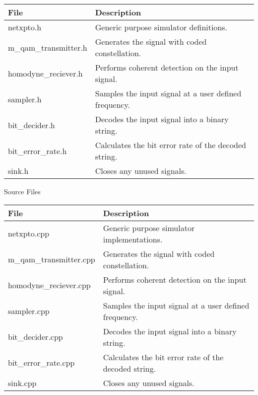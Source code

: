 \begin{table}[H]
\centering
\begin{tabulary}{1.0\textwidth}{|L|L|}
\hline
\textbf{File}            & \textbf{Description} 				                  \\ \hline
netxpto.h                & Generic purpose simulator definitions.	              \\ \hline
m\_qam\_transmitter.h    & Generates the signal with coded constellation.       \\ \hline
homodyne\_reciever.h     & Performs coherent detection on the input signal.     \\ \hline
sampler.h                & Samples the input signal at a user defined frequency. \\ \hline
bit\_decider.h           & Decodes the input signal into a binary string.       \\ \hline
bit\_error\_rate.h       & Calculates the bit error rate of the decoded string. \\ \hline
sink.h                   & Closes any unused signals.                           \\ \hline
\end{tabulary}
\end{table}		
%
Source Files
\begin{table}[H]
\centering
\begin{tabulary}{1.0\textwidth}{|L|L|}
\hline
\textbf{File}              & \textbf{Description} 					             \\ \hline
netxpto.cpp                & Generic purpose simulator implementations.           \\ \hline
m\_qam\_transmitter.cpp    &  Generates the signal with coded constellation.      \\ \hline
homodyne\_reciever.cpp     & Performs coherent detection on the input signal.     \\ \hline
sampler.cpp                & Samples the input signal at a user defined frequency. \\ \hline
bit\_decider.cpp           & Decodes the input signal into a binary string.       \\ \hline
bit\_error\_rate.cpp       & Calculates the bit error rate of the decoded string. \\ \hline
sink.cpp                   & Closes any unused signals.                           \\ \hline
\end{tabulary}
\end{table}		

